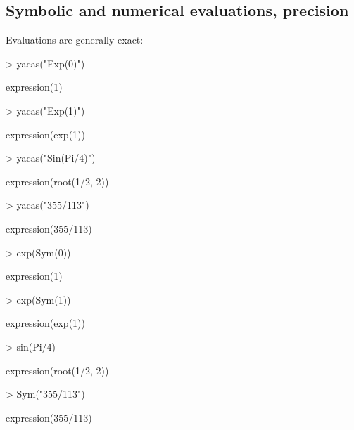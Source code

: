 \documentclass[]{article}
\begin{document}
\subsection{Symbolic and numerical evaluations, precision}

Evaluations are generally exact:
\begin{Schunk}
\begin{Sinput}
> yacas("Exp(0)")
\end{Sinput}
\begin{Soutput}
expression(1)
\end{Soutput}
\begin{Sinput}
> yacas("Exp(1)")
\end{Sinput}
\begin{Soutput}
expression(exp(1))
\end{Soutput}
\begin{Sinput}
> yacas("Sin(Pi/4)")
\end{Sinput}
\begin{Soutput}
expression(root(1/2, 2))
\end{Soutput}
\begin{Sinput}
> yacas("355/113")
\end{Sinput}
\begin{Soutput}
expression(355/113)
\end{Soutput}
\end{Schunk}

\begin{Schunk}
\begin{Sinput}
> exp(Sym(0))
\end{Sinput}
\begin{Soutput}
expression(1)
\end{Soutput}
\begin{Sinput}
> exp(Sym(1))
\end{Sinput}
\begin{Soutput}
expression(exp(1))
\end{Soutput}
\begin{Sinput}
> sin(Pi/4)
\end{Sinput}
\begin{Soutput}
expression(root(1/2, 2))
\end{Soutput}
\begin{Sinput}
> Sym("355/113")
\end{Sinput}
\begin{Soutput}
expression(355/113)
\end{Soutput}
\end{Schunk}
\end{document}
